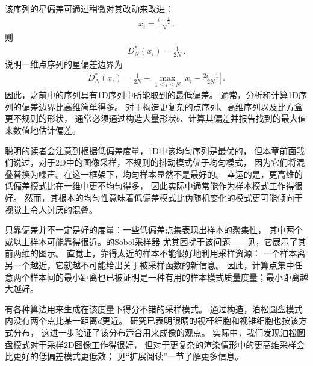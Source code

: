 该序列的星偏差可通过稍微对其改动来改进：
\begin{align}\label{eq:7.5}
    x_i=\frac{i-\frac{1}{2}}{N}\, .
\end{align}
则
\begin{align*}
    D^*_N(x_i)=\frac{1}{2N}\, .
\end{align*}
说明一维点序列的星偏差边界为
\begin{align*}
    D^*_N(x_i)=\frac{1}{2N}+\max\limits_{1\le i\le N}\left|x_i-\frac{2i-1}{2N}\right|\, .
\end{align*}
因此，之前中的序列具有1D序列中所能取到的最低偏差。
通常，分析和计算1D序列的偏差边界比高维简单得多。
对于构造更复杂的点序列、高维序列以及比方盒更不规则的形状，
通常必须通过构造大量形状$b$、计算其偏差并报告找到的最大值来数值地估计偏差。

聪明的读者会注意到根据低偏差度量，1D中该均匀序列是最优的，
但本章前面我们说过，对于2D中的图像采样，不规则的抖动模式优于均匀模式，
因为它们将混叠替换为噪声。在这一框架下，均匀样本显然不是最好的。
幸运的是，更高维的低偏差模式比在一维中更不均匀得多，
因此实际中通常能作为样本模式工作得很好。
然而，其根本的均匀性意味着低偏差模式比伪随机变化的模式更可能倾向于视觉上令人讨厌的混叠。

只靠偏差并不一定是好的度量：一些低偏差点集表现出样本的聚集性，
其中两个或以上样本可能靠得很近。的Sobol采样器
尤其困扰于该问题——见，它展示了其前两维的图示。
直觉上，靠得太近的样本不能很好地利用采样资源：
一个样本离另一个越近，它就越不可能给出关于被采样函数的新信息。
因此，计算点集中任意两个样本间的最小距离也已被证明是一种有用的样本模式质量度量；最小距离越大越好。

有各种算法用来生成在该度量下得分不错的采样模式。
通过构造，泊松圆盘模式内没有两个点比某一距离$d$更近。
研究已表明眼睛的视杆细胞和视锥细胞也按该方式分布，
这进一步验证了该分布适合用来成像的观点。
实际中，我们发现泊松圆盘模式对于采样2D图像工作得很好，
但对于更复杂的渲染情形中的更高维采样会比更好的低偏差模式更低效；
见“扩展阅读”一节了解更多信息。

